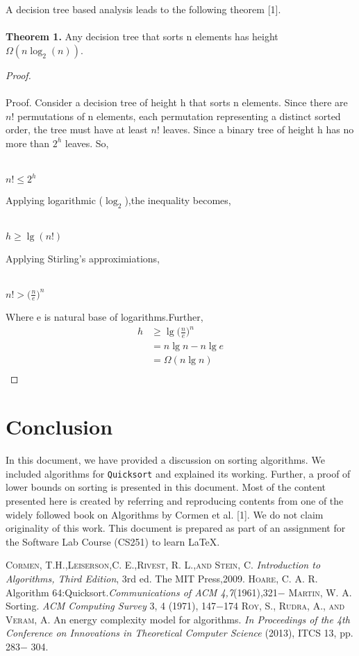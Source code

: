 \documentclass[a4paper, 10pt,twocolumn]{article}
\begin{document}
A decision tree based analysis leads to the following theorem [1].
\\\\\textbf{Theorem 1.} Any decision tree that sorts n elements has height $\Omega(n\log_2 (n))$.
\begin{proof}
\\\\Proof. Consider a decision tree of height h that sorts n elements. Since there are $n!$ permutations of n elements, each permutation representing a distinct sorted order, the tree must have at least $n!$ leaves. Since a binary tree of height h has no more than $2^h$ leaves. So,
\begin{flushleft}
\\$n! \leq 2^h$\\
\end{flushleft}
Applying logarithmic ($\log_2$),the inequality becomes,
\begin{flushleft}
\\$h \geq \lg (n!)$\\
\end{flushleft}
Applying Stirling's approximiations,
\begin{flushleft}
  \\$n! > \Big(\frac{n}{e}\Big)^n$\\
\end{flushleft}
Where e is natural base of logarithms.Further,
\begin{align*}
  h  & \geq \lg \Big(\frac{n}{e} \Big)^n \\
   &=n\lg n-n\lg e \\
   &=\Omega(n\lg n) \\
\end{align*}
\end{proof}
\section{Conclusion}
\noindent
In this document, we have provided a discussion
on sorting algorithms. We included algorithms for
\texttt{Quicksort} and explained its working. Further, a
proof of lower bounds on sorting is presented in this
document. Most of the content presented here is
created by referring and reproducing contents from
one of the widely followed book on Algorithms by Cormen et al. [1]. We do not claim originality of this work. This document is prepared as part of an assignment for the Software Lab Course (CS251) to learn \LaTeX .
\begin{thebibliography}{25}
   {\scshape Cormen, T.H.,Leiserson,C. E.,Rivest, R. L.,and Stein, C.} \textit{Introduction to Algorithms, Third Edition}, 3rd ed. The MIT Press,2009.
   \textsc{Hoare, C. A. R.} Algorithm 64:Quicksort.\textit{Communications of ACM 4,7}(1961),321$-$
  \bibitem{} {\scshape Martin, W. A.} Sorting. \textit{ACM Computing Survey} 3, 4 (1971), 147$-$174
  \bibitem{} \textsc{Roy, S., Rudra, A., and Veram, A.} An energy complexity model for algorithms. \textit{In Proceedings of the 4th Conference on Innovations in Theoretical Computer Science }(2013), ITCS 13, pp. 283$-$ 304.
\end{thebibliography}
\end{document}
